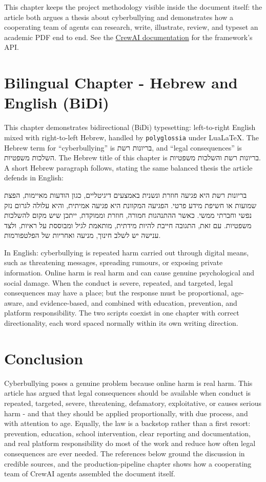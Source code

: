 \documentclass[11pt,a4paper]{report}
\begin{document}
This chapter keeps the project methodology visible inside the document itself:
the article both argues a thesis about cyberbullying and demonstrates how a
cooperating team of agents can research, write, illustrate, review, and typeset
an academic PDF end to end. See the
\href{https://docs.crewai.com}{CrewAI documentation} for the framework's API.

\chapter{Bilingual Chapter - Hebrew and English (BiDi)}
This chapter demonstrates bidirectional (BiDi) typesetting: left-to-right
English mixed with right-to-left Hebrew, handled by \texttt{polyglossia} under
LuaLaTeX. The Hebrew term for ``cyberbullying'' is
\texthebrew{בריונות רשת}, and ``legal consequences'' is
\texthebrew{השלכות משפטיות}. The Hebrew title of this chapter is
\texthebrew{בריונות רשת והשלכות משפטיות}. A short Hebrew paragraph follows,
stating the same balanced thesis the article defends in English:
\begin{hebrew}
בריונות רשת היא פגיעה חוזרת ונשנית באמצעים דיגיטליים, כגון הודעות מאיימות,
הפצת שמועות או חשיפת מידע פרטי. הפגיעה המקוונת היא פגיעה אמיתית, והיא עלולה
לגרום נזק נפשי וחברתי ממשי. כאשר ההתנהגות חמורה, חוזרת וממוקדת, ייתכן שיש
מקום להשלכות משפטיות. עם זאת, התגובה חייבת להיות מידתית, מותאמת לגיל ומבוססת
על ראיות, ולצד ענישה יש לשלב חינוך, מניעה ואחריות של הפלטפורמות.
\end{hebrew}
In English: cyberbullying is repeated harm carried out through digital means,
such as threatening messages, spreading rumours, or exposing private
information. Online harm is real harm and can cause genuine psychological and
social damage. When the conduct is severe, repeated, and targeted, legal
consequences may have a place; but the response must be proportional,
age-aware, and evidence-based, and combined with education, prevention, and
platform responsibility. The two scripts coexist in one chapter with correct
directionality, each word spaced normally within its own writing direction.

\chapter{Conclusion}
Cyberbullying poses a genuine problem because online harm is real harm. This
article has argued that legal consequences should be available when conduct is
repeated, targeted, severe, threatening, defamatory, exploitative, or causes
serious harm - and that they should be applied proportionally, with due
process, and with attention to age. Equally, the law is a backstop rather than
a first resort: prevention, education, school intervention, clear reporting and
documentation, and real platform responsibility do most of the work and reduce
how often legal consequences are ever needed. The references below ground the
discussion in credible sources, and the production-pipeline chapter shows how a
cooperating team of CrewAI agents assembled the document itself.

\printbibliography[heading=bibintoc,title={References}]
\end{document}
